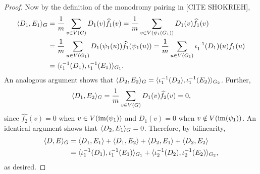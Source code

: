 \begin{proof}
Now by the definition of the monodromy pairing in [CITE SHOKRIEH],
\begin{align*}
\langle D_1, E_1 \rangle_G &= \frac{1}{m} \sum_{v \in V(G)} D_1(v) \widehat{f_1}(v) = \frac{1}{m} \sum_{v \in V(\psi_1(G_1))} D_1(v) \widehat{f_1}(v) \\ 
&= \frac{1}{m} \sum_{u \in V(G_1)} D_1(\psi_1(u)) \widehat{f_1}(\psi_1(u)) = \frac{1}{m} \sum_{u\in V(G_1)} \iota_1^{-1}(D_1)(u)f_1(u) \\
&= \langle \iota_1^{-1}(D_1), \iota_1^{-1}(E_1) \rangle_{G_1}.
\end{align*}
An analogous argument shows that $\langle D_2, E_2 \rangle_G = \langle \iota_1^{-1}(D_2), \iota_1^{-1}(E_2) \rangle_{G_2}$. Further,
\[
\langle D_1, E_2 \rangle_G = \frac{1}{m} \sum_{v \in V(G)} D_1(v) \widehat{f_2}(v) = 0,
\]
since $\widehat{f_2}(v)=0$ when $v\in V(\operatorname{im}(\psi_1))$ and $D_1(v)=0$ when $v\notin V(\operatorname{im}(\psi_1))$. An identical argument shows that $\langle D_2, E_1 \rangle_G = 0$. Therefore, by bilinearity,
\begin{align*}
\langle D, E \rangle_G &= \langle D_1, E_1 \rangle + \langle D_1, E_2 \rangle + \langle D_2, E_1 \rangle + \langle D_2, E_2 \rangle \\
&= \langle \iota_1^{-1}(D_1), \iota_1^{-1}(E_1) \rangle_{G_1} + \langle \iota_2^{-1}(D_2), \iota_2^{-1}(E_2) \rangle_{G_2},
\end{align*}
as desired.
\end{proof}